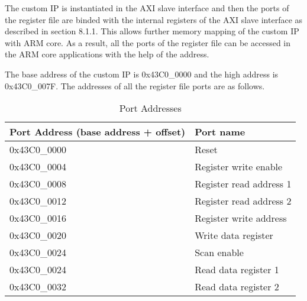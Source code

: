 
The custom IP is instantiated in the AXI slave interface and then the ports of the register file are binded with the internal registers of the AXI slave interface as described in section 8.1.1. This allows further memory mapping of the custom IP with ARM core. As a result, all the ports of the register file can be accessed in the ARM core applications with the help of the address. 
\vspace{2mm}

The base address of the custom IP is 0x43C0\_0000 and the high address is 0x43C0\_007F. The addresses of all the register file ports are as follows.

\begin{table}[h]
		\centering
		\begin{tabularx}{\textwidth}{|p{3cm}   |X|}
			\hline
			\textbf{Port Address
(base address + offset)
}  & \textbf{Port name}\\
			\hline
			0x43C0\_0000 & Reset     \\
            \hline
			0x43C0\_0004 & Register write enable  \\
			\hline
			0x43C0\_0008 & Register read address 1  \\
			\hline
			0x43C0\_0012 & Register read address 2 \\
			\hline
            0x43C0\_0016 & Register write address\\
			\hline
            0x43C0\_0020 & Write data register \\
			\hline
           0x43C0\_0024 & Scan enable \\
			\hline
           0x43C0\_0024 & Read data register 1 \\
			\hline
           0x43C0\_0032 & Read data register 2 \\
			\hline
		\end{tabularx}
		\caption{Port Addresses}
	\end{table}
